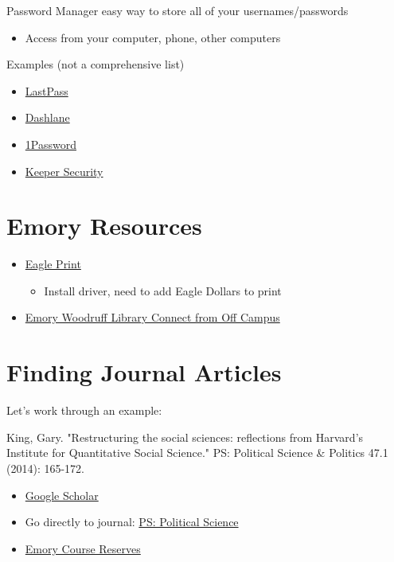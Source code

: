 \documentclass[11pt]{article}
\begin{document}
Password Manager easy way to store all of your usernames/passwords
\begin{itemize}
  \item Access from your computer, phone, other computers
\end{itemize}

Examples (not a comprehensive list)
\begin{itemize}
  \item \href{https://lastpass.com/}{LastPass}
  \item \href{https://www.dashlane.com/}{Dashlane}
  \item \href{https://1password.com/}{1Password}
  \item \href{https://keepersecurity.com/}{Keeper Security}
\end{itemize}

\section*{Emory Resources}
\begin{itemize}
  \item \href{http://it.emory.edu/studentdigitallife/services/eagleprint/}{Eagle Print}
  \begin{itemize}
    \item Install driver, need to add Eagle Dollars to print
  \end{itemize}
  \item \href{http://web.library.emory.edu/using-the-library/off-campus.html}{Emory Woodruff Library Connect from Off Campus}
\end{itemize}

\section*{Finding Journal Articles }
Let's work through an example:\\
\vspace{5mm}

King, Gary. "Restructuring the social sciences: reflections from Harvard's Institute for Quantitative Social Science." PS: Political Science \& Politics 47.1 (2014): 165-172.

\begin{itemize}
  \item \href{https://scholar.google.com/}{Google Scholar}
  \item Go directly to journal: \href{https://www.cambridge.org/core/journals/ps-political-science-and-politics#}{PS: Political Science}
  \item \href{http://web.library.emory.edu/using-the-library/course-reserves/index.html}{Emory Course Reserves}
\end{itemize}
\end{document}
